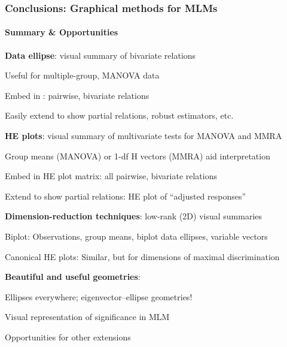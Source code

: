 \begin{frame}
  \frametitle{Conclusions: Graphical methods for MLMs}
  \framesubtitle{Summary \& Opportunities}
	\begin{itemize*}
	 \item<1-> \alert{{\bfseries Data ellipse}}:  visual summary of bivariate relations
    	\begin{itemize*}
		\item Useful for multiple-group, MANOVA data
		\item Embed in \scatmat{}: pairwise, bivariate relations
		\item Easily extend to show partial relations, robust estimators, etc.
		\end{itemize*}
	  \item<2-> \alert{{\bfseries HE plots}}: visual summary of multivariate tests for MANOVA and MMRA
    	\begin{itemize*}
		\item Group means (MANOVA) or 1-df H vectors (MMRA) aid interpretation
		\item Embed in HE plot matrix: all pairwise, bivariate relations
		\item Extend to show partial relations: HE plot of ``adjusted responses''
		\end{itemize*}

	 \item<3-> {\bfseries \alert{Dimension-reduction} techniques}:  low-rank (2D) visual summaries
    	\begin{itemize*}
		\item Biplot:  Observations, group means, biplot data ellipses, variable vectors
		\item Canonical HE plots:  Similar, but for dimensions of maximal discrimination
		\end{itemize*}
	 \item<4-> {\bfseries Beautiful and useful \alert{geometries}}:
    	\begin{itemize*}
		\item Ellipses everywhere; eigenvector--ellipse geometries!
		\item Visual representation of significance in MLM
		\item Opportunities for other extensions
		\end{itemize*}
	\end{itemize*}
\end{frame}

